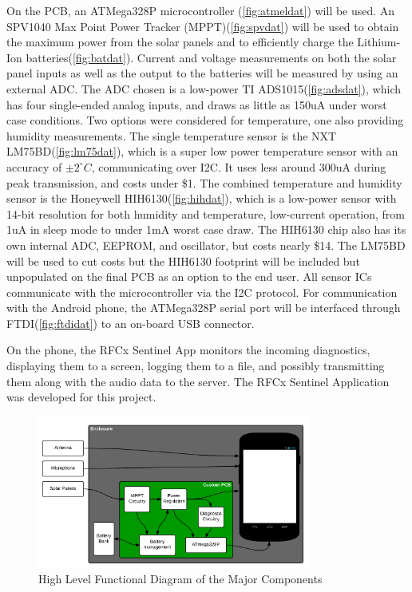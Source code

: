 \documentclass{article}
\begin{document}
{\bigskip
On the PCB, an ATMega328P microcontroller (\ref{fig:atmeldat}) will be used. An SPV1040 Max Point Power Tracker (MPPT)(\ref{fig:spvdat}) will be used to obtain the maximum power from the solar panels and to efficiently charge the Lithium-Ion batteries(\ref{fig:batdat}). Current and voltage measurements on both the solar panel inputs as well as the output to the batteries will be measured by using an external ADC. The ADC chosen is a low-power TI ADS1015(\ref{fig:adsdat}), which has four single-ended analog inputs, and draws as little as 150uA under worst case conditions. Two options were considered for temperature, one also providing humidity measurements. The single temperature sensor is the NXT LM75BD(\ref{fig:lm75dat}), which is a super low power temperature sensor with an accuracy of $\pm2^{\circ}C$, communicating over I2C. It uses less around 300uA during peak transmission, and costs under \$1. The combined temperature and humidity sensor is the Honeywell HIH6130(\ref{fig:hihdat}), which is a low-power sensor with 14-bit resolution for both humidity and temperature, low-current operation, from 1uA in sleep mode to under 1mA worst case draw. The HIH6130 chip also has its own internal ADC, EEPROM, and oscillator, but costs nearly \$14. The LM75BD will be used to cut costs but the HIH6130 footprint will be included but unpopulated on the final PCB as an option to the end user.  All sensor ICs communicate with the microcontroller via the I2C protocol. For communication with the Android phone, the ATMega328P serial port will be interfaced through FTDI(\ref{fig:ftdidat}) to an on-board USB connector.

On the phone, the RFCx Sentinel App monitors the incoming diagnostics, displaying them to a screen, logging them to a file, and possibly transmitting them along with the audio data to the server. The RFCx Sentinel Application was developed for this project. 


\begin{figure}[H]
  \centering
  \includegraphics[width=0.8\textwidth]{Highlevel}
  \caption{High Level Functional Diagram of the Major Components}
  \label{fig:hldia}
\end{figure}

}
\end{document}

